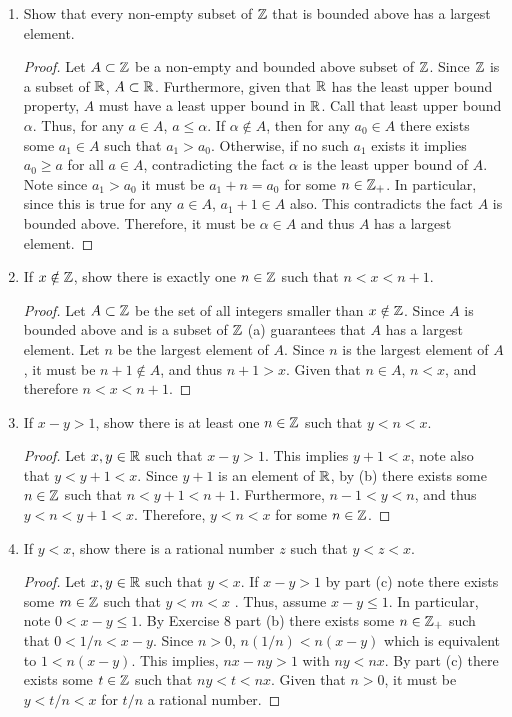 \documentclass[12pt]{article}
\begin{document}
	\begin{enumerate}[label=(\alph*)]
		\item Show that every non-empty subset of $\mathbb{Z}$ that is bounded above has a largest element.
		\begin{proof}
			Let $A \subset \mathbb{Z}$ be a non-empty and bounded above subset of $\mathbb{Z}$. Since $\mathbb{Z}$ is a subset
			of $\mathbb{R}$, $A \subset \mathbb{R}$. Furthermore, given that $\mathbb{R}$ has the least upper bound 
			property, $A$ must have a least upper bound in $\mathbb{R}$. Call that least upper bound $\alpha$.
			Thus, for any $a \in A$, $a \leq \alpha$. If $\alpha \notin A$, then for any $a_0 \in A$
			there exists some $a_1 \in A$ such that $a_1 > a_0$. Otherwise, if no such $a_1$ exists
			it implies $a_0 \geq a$ for all $a \in A$, contradicting the fact $\alpha$ is the least upper
			bound of $A$. Note since $a_1 > a_0$ it must be $a_1 + n = a_0$ for some $n \in \mathbb{Z}_{+}$.
			In particular, since this is true for any $a \in A$, $a_1 + 1 \in A$ also. This contradicts
			the fact $A$ is bounded above. Therefore, it must be $\alpha \in A$ and thus $A$ has a largest
			element.
		\end{proof}
		\item If $x \notin \mathbb{Z}$, show there is exactly one $n \in \mathbb{Z}$ such that $n < x < n + 1$.
		\begin{proof}
			Let $A \subset \mathbb{Z}$ be the set of all integers smaller than $x \notin \mathbb{Z}$. Since $A$ is bounded
			above and is a subset of $\mathbb{Z}$ (a) guarantees that $A$ has a largest element. Let 
			$n$ be the largest element of $A$. Since $n$ is the largest element of $A$, it must be
			$n + 1 \notin A$, and thus $n + 1 > x$. Given that $n \in A$, $n < x$, and 
			therefore $n < x < n + 1$.
		\end{proof}
		\item If $x - y > 1$, show there is at least one $n \in \mathbb{Z}$ such that $y < n < x$.
		\begin{proof}
			Let $x, y \in \mathbb{R}$ such that $x - y > 1$. This implies $y + 1 < x$, note also that $y < y + 1 < x$.
			Since $y + 1$ is an element of $\mathbb{R}$, by (b) there exists some $n \in \mathbb{Z}$ such that 
			$n < y + 1 < n + 1$. Furthermore, $n - 1 < y < n$, and thus $y < n < y + 1 < x$.
			Therefore, $y < n < x$ for some $n \in \mathbb{Z}$.
		\end{proof}
		\item If $y < x$, show there is a rational number $z$ such that $y < z < x$. 
		\begin{proof}
			Let $x, y \in \mathbb{R}$ such that $y < x$. If $x - y > 1$ by part (c) note there
			exists some $m \in \mathbb{Z}$ such that $y < m < x$ . Thus, assume $x - y \leq 1$.
			In particular, note $0 < x - y \leq 1$. By Exercise 8 part (b) there exists some 
			$n \in \mathbb{Z}_{+}$ such that $0 < 1/n < x - y$. Since $n > 0$, $n(1/n) < n(x - y)$ which 
			is equivalent to $1 < n(x - y)$. This implies, $nx - ny > 1$ with $ny < nx$.
			By part (c) there exists some $t \in \mathbb{Z}$ such that $ny < t < nx$. Given that
			$n > 0$, it must be $y < t/n < x$ for $t/n$ a rational number.
		\end{proof}
	\end{enumerate}
	
\end{document}
